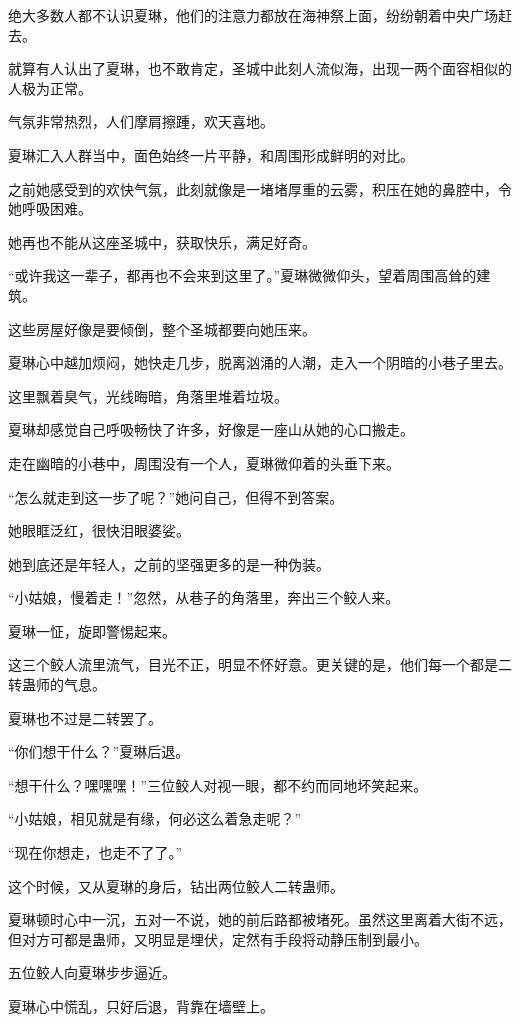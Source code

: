 \begin{this_body}
绝大多数人都不认识夏琳，他们的注意力都放在海神祭上面，纷纷朝着中央广场赶去。

就算有人认出了夏琳，也不敢肯定，圣城中此刻人流似海，出现一两个面容相似的人极为正常。

气氛非常热烈，人们摩肩擦踵，欢天喜地。

夏琳汇入人群当中，面色始终一片平静，和周围形成鲜明的对比。

之前她感受到的欢快气氛，此刻就像是一堵堵厚重的云雾，积压在她的鼻腔中，令她呼吸困难。

她再也不能从这座圣城中，获取快乐，满足好奇。

“或许我这一辈子，都再也不会来到这里了。”夏琳微微仰头，望着周围高耸的建筑。

这些房屋好像是要倾倒，整个圣城都要向她压来。

夏琳心中越加烦闷，她快走几步，脱离汹涌的人潮，走入一个阴暗的小巷子里去。

这里飘着臭气，光线晦暗，角落里堆着垃圾。

夏琳却感觉自己呼吸畅快了许多，好像是一座山从她的心口搬走。

走在幽暗的小巷中，周围没有一个人，夏琳微仰着的头垂下来。

“怎么就走到这一步了呢？”她问自己，但得不到答案。

她眼眶泛红，很快泪眼婆娑。

她到底还是年轻人，之前的坚强更多的是一种伪装。

“小姑娘，慢着走！”忽然，从巷子的角落里，奔出三个鲛人来。

夏琳一怔，旋即警惕起来。

这三个鲛人流里流气，目光不正，明显不怀好意。更关键的是，他们每一个都是二转蛊师的气息。

夏琳也不过是二转罢了。

“你们想干什么？”夏琳后退。

“想干什么？嘿嘿嘿！”三位鲛人对视一眼，都不约而同地坏笑起来。

“小姑娘，相见就是有缘，何必这么着急走呢？”

“现在你想走，也走不了了。”

这个时候，又从夏琳的身后，钻出两位鲛人二转蛊师。

夏琳顿时心中一沉，五对一不说，她的前后路都被堵死。虽然这里离着大街不远，但对方可都是蛊师，又明显是埋伏，定然有手段将动静压制到最小。

五位鲛人向夏琳步步逼近。

夏琳心中慌乱，只好后退，背靠在墙壁上。


\end{this_body}

